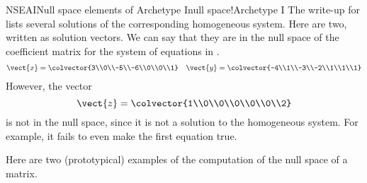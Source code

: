 \begin{example}{NSEAI}{Null space elements of Archetype I}{null space!Archetype I}
The write-up for  lists several solutions of the corresponding homogeneous system.  Here are two, written as solution vectors.  We can say that they are in the null space of the coefficient matrix for the system of equations in .
%
\begin{align*}
\vect{x}=\colvector{3\\0\\-5\\-6\\0\\0\\1}&&
\vect{y}=\colvector{-4\\1\\-3\\-2\\1\\1\\1}
\end{align*}
%
However, the vector
%
\begin{equation*}
\vect{z}=\colvector{1\\0\\0\\0\\0\\0\\2}
\end{equation*}
%
is not in the null space, since it is not a solution to the homogeneous system.  For example, it fails to even make the first equation true.
%
\end{example}
%
Here are two (prototypical) examples of the computation of the null space of a matrix.
%
